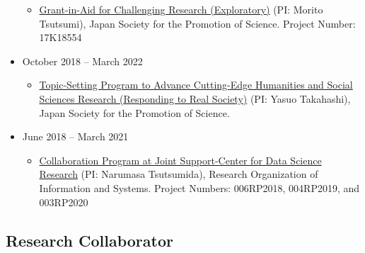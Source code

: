 \documentclass[
]{book}
\providecommand{\tightlist}{%
  \setlength{\itemsep}{0pt}\setlength{\parskip}{0pt}}
\begin{document}
\begin{itemize}
  \begin{itemize}
  \tightlist
  \item
    \href{https://kaken.nii.ac.jp/en/grant/KAKENHI-PROJECT-17K18554/}{Grant-in-Aid for Challenging Research (Exploratory)} (PI: Morito Tsutsumi),
    Japan Society for the Promotion of Science.
    Project Number: 17K18554
  \end{itemize}
\item
  October 2018 -- March 2022

  \begin{itemize}
  \tightlist
  \item
    \href{https://www.jsps.go.jp/english/e-kadai/jissyakai/index.html}{Topic-Setting Program to Advance Cutting-Edge Humanities and Social Sciences Research (Responding to Real Society)} (PI: Yasuo Takahashi),
    Japan Society for the Promotion of Science.
  \end{itemize}
\item
  June 2018 -- March 2021

  \begin{itemize}
  \tightlist
  \item
    \href{https://ds.rois.ac.jp/en_crp/en_calling/}{Collaboration Program at Joint Support-Center for Data Science Research} (PI: Narumasa Tsutsumida),
    Research Organization of Information and Systems.
    Project Numbers: 006RP2018, 004RP2019, and 003RP2020
  \end{itemize}
\end{itemize}

\subsection*{Research Collaborator}\label{research-collaborator}
\end{document}
